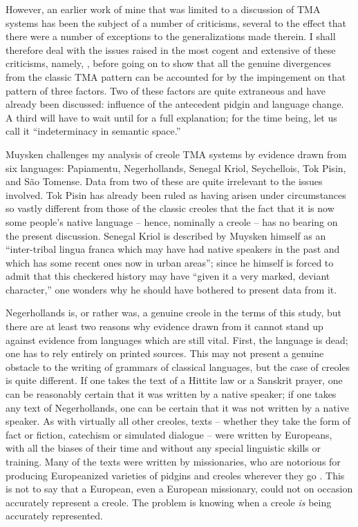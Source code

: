 However, an earlier work of mine \citep{Bickerton1974} that was limited to a discussion of TMA systems has been the subject of a number of criticisms, several to the effect that there were a number of exceptions to the generalizations made therein. I shall therefore deal with the issues raised in the most cogent and extensive of these criti\-cisms, namely, \citet{Muysken1981a}, before going on to show that all the genuine divergences from the classic TMA pattern can be accounted for by the impingement on that pattern of three factors. Two of these factors are quite extraneous and have already been discussed: influence of the antecedent pidgin and language change. A third will have to wait until  for a full explanation; for the time being, let us call it ``indeterminacy in semantic space.''

Muysken challenges my analysis of creole TMA systems by evidence drawn from six languages: Papiamentu, Negerhollands, Senegal Kriol, Seychellois, Tok Pisin, and S{\~a}o Tomense. Data from two of these are quite irrelevant to the issues involved. Tok Pisin has already been ruled as having arisen under circumstances so vastly different from those of the classic creoles that the fact that it is now some people's%
native language -- hence, nominally a creole -- has no bearing on the present discussion. Senegal Kriol is described by Muysken himself as an ``inter-tribal lingua franca which may have had native speakers in the past and which has some recent ones now in urban areas''; since he himself is forced to admit that this checkered history may have ``given it a very marked, deviant character,'' one wonders why he should have bothered to present data from it.

Negerhollands is, or rather was, a genuine creole in the terms of this study, but there are at least two reasons why evidence drawn from it cannot stand up against evidence from languages which are still vital. First, the language is dead; one has to rely entirely on printed sources. This may not present a genuine obstacle to the writing of grammars of classical languages, but the case of creoles is quite different. If one takes the text of a Hittite law or a Sanskrit prayer, one can be reasonably certain that it was written by a native speaker; if one takes any text of Negerhollands, one can be certain that it was not written by a native speaker. As with virtually all other creoles, texts -- whether they take the form of fact or fiction, catechism or simulated dialogue -- were written by Europeans, with all the biases of their time and without any special linguistic skills or training. Many of the texts were written by missionaries, who are notorious for producing Europeanized varieties of pidgins and creoles wherever they go \citep{Voorhoeve1971}. This is not to say that a European, even a European missionary, could not on occasion accurately represent a creole. The problem is knowing when a creole \textit{is} being accurately represented.

